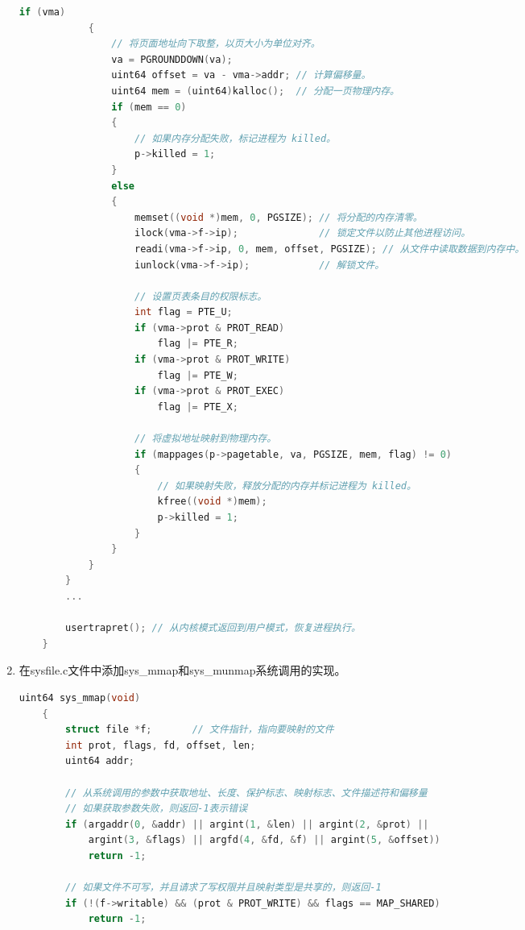 \begin{enumerate}
\begin{lstlisting}[language=c,title=对usertrap函数的修改]
            if (vma)
            {
                // 将页面地址向下取整，以页大小为单位对齐。
                va = PGROUNDDOWN(va);
                uint64 offset = va - vma->addr; // 计算偏移量。
                uint64 mem = (uint64)kalloc();  // 分配一页物理内存。
                if (mem == 0)
                {
                    // 如果内存分配失败，标记进程为 killed。
                    p->killed = 1;
                }
                else
                {
                    memset((void *)mem, 0, PGSIZE); // 将分配的内存清零。
                    ilock(vma->f->ip);              // 锁定文件以防止其他进程访问。
                    readi(vma->f->ip, 0, mem, offset, PGSIZE); // 从文件中读取数据到内存中。
                    iunlock(vma->f->ip);            // 解锁文件。
            
                    // 设置页表条目的权限标志。
                    int flag = PTE_U;
                    if (vma->prot & PROT_READ)
                        flag |= PTE_R;
                    if (vma->prot & PROT_WRITE)
                        flag |= PTE_W;
                    if (vma->prot & PROT_EXEC)
                        flag |= PTE_X;
            
                    // 将虚拟地址映射到物理内存。
                    if (mappages(p->pagetable, va, PGSIZE, mem, flag) != 0)
                    {
                        // 如果映射失败，释放分配的内存并标记进程为 killed。
                        kfree((void *)mem);
                        p->killed = 1;
                    }
                }
            }
        }
        ...
    
        usertrapret(); // 从内核模式返回到用户模式，恢复进程执行。
    }    
    \end{lstlisting}
    \item 在sysfile.c文件中添加sys\_mmap和sys\_munmap系统调用的实现。
          \begin{lstlisting}[language=c,title=sys\_mmap的实现]
    uint64 sys_mmap(void)
    {
        struct file *f;       // 文件指针，指向要映射的文件
        int prot, flags, fd, offset, len;
        uint64 addr;
    
        // 从系统调用的参数中获取地址、长度、保护标志、映射标志、文件描述符和偏移量
        // 如果获取参数失败，则返回-1表示错误
        if (argaddr(0, &addr) || argint(1, &len) || argint(2, &prot) ||
            argint(3, &flags) || argfd(4, &fd, &f) || argint(5, &offset))
            return -1;
    
        // 如果文件不可写，并且请求了写权限并且映射类型是共享的，则返回-1
        if (!(f->writable) && (prot & PROT_WRITE) && flags == MAP_SHARED)
            return -1;
    

\end{lstlisting}
\end{enumerate}
